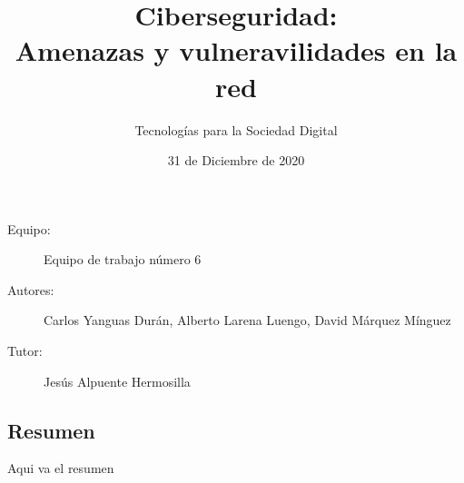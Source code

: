  
  
  

\graphicspath{{../Book/figures/}{../Book/diagrams/}{../Book/photos/}} 

 
\title{{\Huge Ciberseguridad: \\ Amenazas y vulneravilidades en la red}}
\date{{\large 31 de Diciembre de 2020}}
\author{{\Large Tecnologías para la Sociedad Digital}}





\maketitle
\begin{description}                                                      
\item [Equipo:] Equipo de trabajo número 6  
\item [Autores:] Carlos Yanguas Durán, Alberto Larena Luengo, David Márquez Mínguez   
\item[Tutor:] Jesús Alpuente Hermosilla      
\end{description}  


\begin{center}
\section*{Resumen}
\label{sec:resumen}
\end{center}

Aqui va el resumen


                  




\hypersetup{linkcolor=blue}

                        

